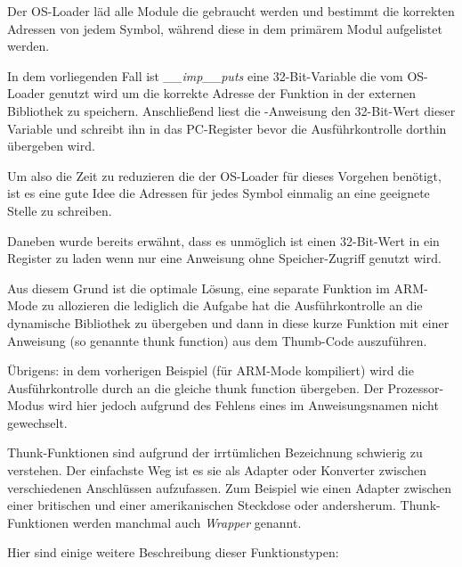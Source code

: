 Der \ac{OS}-Loader läd alle Module die gebraucht werden und bestimmt die korrekten Adressen von jedem Symbol,
während diese in dem primärem Modul aufgelistet werden.

In dem vorliegenden Fall ist \emph{\_\_imp\_\_puts} eine 32-Bit-Variable die vom \ac{OS}-Loader genutzt wird
um die korrekte Adresse der Funktion in der externen Bibliothek zu speichern.
Anschließend liest die -Anweisung den 32-Bit-Wert dieser Variable und schreibt ihn in das \ac{PC}-Register
bevor die Ausführkontrolle dorthin übergeben wird.

Um also die Zeit zu reduzieren die der \ac{OS}-Loader für dieses Vorgehen benötigt, ist es eine gute Idee
die Adressen für jedes Symbol einmalig an eine geeignete Stelle zu schreiben.

Daneben wurde bereits erwähnt, dass es unmöglich ist einen 32-Bit-Wert in ein Register zu laden wenn
nur eine Anweisung ohne Speicher-Zugriff genutzt wird.

Aus diesem Grund ist die optimale Lösung, eine separate Funktion im ARM-Mode zu allozieren die lediglich
die Aufgabe hat die Ausführkontrolle an die dynamische Bibliothek zu übergeben und dann in diese kurze
Funktion mit einer Anweisung (so genannte \gls{thunk function}) aus dem Thumb-Code auszuführen.

Übrigens: in dem vorherigen Beispiel (für ARM-Mode kompiliert) wird die Ausführkontrolle durch 
an die gleiche \gls{thunk function} übergeben.
Der Prozessor-Modus wird hier jedoch aufgrund des Fehlens eines  im Anweisungsnamen nicht gewechselt.


Thunk-Funktionen sind aufgrund der irrtümlichen Bezeichnung schwierig zu verstehen.
Der einfachste Weg ist es sie als Adapter oder Konverter zwischen verschiedenen Anschlüssen aufzufassen.
Zum Beispiel wie einen Adapter zwischen einer britischen und einer amerikanischen Steckdose oder andersherum.
Thunk-Funktionen werden manchmal auch \emph{Wrapper} genannt.

Hier sind einige weitere Beschreibung dieser Funktionstypen:

